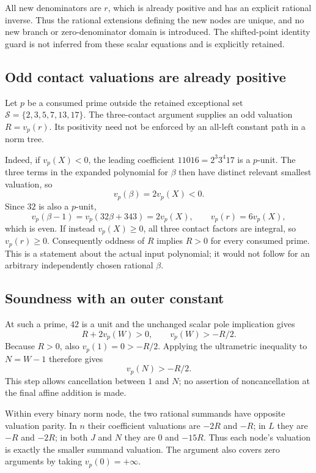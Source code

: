 All new denominators are $r$, which is already positive and has an
explicit rational inverse. Thus the rational extensions defining the
new nodes are unique, and no new branch or zero-denominator domain is
introduced. The shifted-point identity guard is not inferred from
these scalar equations and is explicitly retained.

\subsection{Odd contact valuations are already positive}

Let $p$ be a consumed prime outside the retained exceptional set
$\mathcal S=\{2,3,5,7,13,17\}$. The three-contact argument supplies an
odd valuation $R=v_p(r)$. Its positivity need not be enforced by an
all-left constant path in a norm tree.

Indeed, if $v_p(X)<0$, the leading coefficient
$11016=2^3 3^4 17$ is a $p$-unit. The three terms in the expanded
polynomial for $\beta$ then have distinct relevant smallest valuation,
so
\[
 v_p(\beta)=2v_p(X)<0.
\]
Since $32$ is also a $p$-unit,
\[
 v_p(\beta-1)=v_p(32\beta+343)=2v_p(X),
 \qquad v_p(r)=6v_p(X),
\]
which is even. If instead $v_p(X)\ge0$, all three contact factors are
integral, so $v_p(r)\ge0$. Consequently oddness of $R$ implies $R>0$
for every consumed prime. This is a statement about the actual input
polynomial; it would not follow for an arbitrary independently chosen
rational $\beta$.

\subsection{Soundness with an outer constant}

At such a prime, $42$ is a unit and the unchanged scalar pole implication
gives
\[
 R+2v_p(W)>0,\qquad v_p(W)>-R/2.
\]
Because $R>0$, also $v_p(1)=0>-R/2$. Applying the ultrametric inequality
to $N=W-1$ therefore gives
\[
 v_p(N)>-R/2.
\]
This step allows cancellation between $1$ and $N$; no assertion of
noncancellation at the final affine addition is made.

Within every binary norm node, the two rational summands have opposite
valuation parity. In $n$ their coefficient valuations are $-2R$ and
$-R$; in $L$ they are $-R$ and $-2R$; in both $J$ and $N$ they are
$0$ and $-15R$. Thus each node's valuation is exactly the smaller
summand valuation. The argument also covers zero arguments by taking
$v_p(0)=+\infty$.

